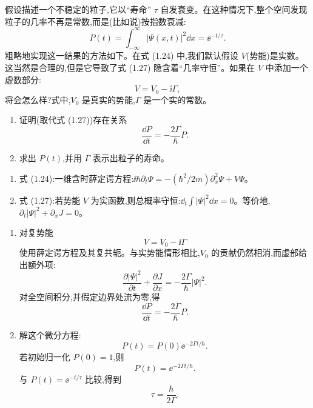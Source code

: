 \begin{question}
假设描述一个不稳定的粒子,它以“寿命” $\tau$ 自发衰变。在这种情况下,整个空间发现粒子的几率不再是常数,而是(比如说)按指数衰减:
\[
P(t)=\int_{-\infty}^{\infty}|\Psi(x,t)|^2\dd x=\ee^{-t/\tau}.
\]
粗略地实现这一结果的方法如下。在式 (1.24) 中,我们默认假设 $V$(势能)是实数。这当然是合理的,但是它导致了式 (1.27) 隐含着“几率守恒”。如果在 $V$ 中添加一个虚数部分:
\[
V=V_0-\ii\Gamma,
\]
将会怎么样?式中,$V_0$ 是真实的势能,$\Gamma$ 是一个实的常数。
\begin{enumerate}
\item 证明(取代式 (1.27))存在关系
\[
\frac{\dd P}{\dd t}=-\frac{2\Gamma}{\hbar}P.
\]
\item 求出 $P(t)$,并用 $\Gamma$ 表示出粒子的寿命。
\end{enumerate}

\par\smallskip
{}
\begin{enumerate}[leftmargin=2.2em,itemsep=0.12em,topsep=0.12em,parsep=0pt]
\item 式 (1.24):一维含时薛定谔方程:$\ii\hbar\partial_t\Psi=-(\hbar^2/2m)\partial_x^2\Psi+V\Psi$。
\item 式 (1.27):若势能 $V$ 为实函数,则总概率守恒:$\dd_t\int |\Psi|^2\dd x=0$。等价地,$\partial_t|\Psi|^2+\partial_xJ=0$。
\end{enumerate}

\begin{solution}
\begin{enumerate}
\item 对复势能
\[
V=V_0-\ii\Gamma
\]
使用薛定谔方程及其复共轭。与实势能情形相比,$V_0$ 的贡献仍然相消,而虚部给出额外项:
\[
\frac{\partial |\Psi|^2}{\partial t}+\frac{\partial J}{\partial x}
=-\frac{2\Gamma}{\hbar}|\Psi|^2.
\]
对全空间积分,并假定边界处流为零,得
\[
\frac{\dd P}{\dd t}=-\frac{2\Gamma}{\hbar}P.
\]
\item 解这个微分方程:
\[
P(t)=P(0)\ee^{-2\Gamma t/\hbar}.
\]
若初始归一化 $P(0)=1$,则
\[
P(t)=\ee^{-2\Gamma t/\hbar}.
\]
与 $P(t)=\ee^{-t/\tau}$ 比较,得到
\[
\tau=\frac{\hbar}{2\Gamma}.
\]
\end{enumerate}
\end{solution}
\end{question}

